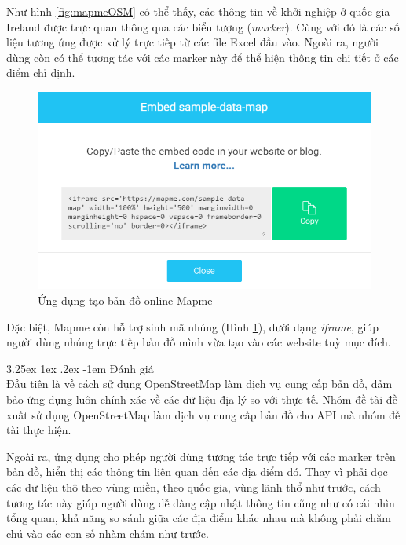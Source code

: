 \documentclass[12pt,a4paper,twoside]{article}
\makeatletter
\newcommand{\myparagraph}[1]{\paragraph{#1}\mbox{}\\} %
\renewcommand\paragraph{\@startsection{paragraph}{5}{\z@}%
  {3.25ex \@plus1ex \@minus.2ex}%
  {-1em}%
  {\normalfont\normalsize\bfseries}}
\makeatother
\begin{document}
Như hình \ref{fig:mapmeOSM} có thể thấy, các thông tin về khởi nghiệp ở quốc gia Ireland được trực quan thông qua các biểu tượng (\textit{marker}). Cùng với đó là các số liệu tương ứng được xử lý trực tiếp từ các file Excel đầu vào.
Ngoài ra, người dùng còn có thể tương tác với các marker này để thể hiện thông tin chi tiết ở các điểm chỉ định.

\begin{figure}[!h]
	\begin{center}
    \includegraphics[scale=.8]{image/mapmeExport}
    \caption{Ứng dụng tạo bản đồ online Mapme}
    \label{fig:mapmeExport}
	\end{center}
\end{figure}

Đặc biệt, Mapme còn hỗ trợ sinh mã nhúng (Hình \ref{fig:mapmeExport}), dưới dạng \textit{iframe}, giúp người dùng nhúng trực tiếp bản đồ mình vừa tạo vào các website tuỳ mục đích.

\myparagraph{Đánh giá}
Đầu tiên là về cách sử dụng OpenStreetMap làm dịch vụ cung cấp bản đồ, đảm bảo ứng dụng luôn chính xác về các dữ liệu địa lý so với thực tế. Nhóm đề tài đề xuất sử dụng OpenStreetMap làm dịch vụ cung cấp bản đồ cho API mà nhóm đề tài thực hiện.

Ngoài ra, ứng dụng cho phép người dùng tương tác trực tiếp với các marker trên bản đồ, hiển thị các thông tin liên quan đến các địa điểm đó. Thay vì phải đọc các dữ liệu thô theo vùng miền, theo quốc gia, vùng lãnh thổ như trước, cách tương tác này giúp người dùng dễ dàng cập nhật thông tin cũng như có cái nhìn tổng quan, khả năng so sánh giữa các địa điểm khác nhau mà không phải chăm chú vào các con số nhàm chám như trước.
\end{document}
